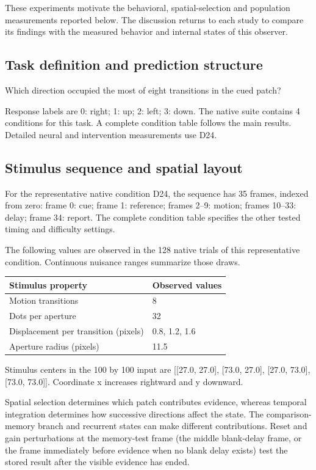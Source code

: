 \documentclass[11pt]{article}
\begin{document}
These experiments motivate the behavioral, spatial-selection and population measurements reported below. The discussion returns to each study to compare its findings with the measured behavior and internal states of this observer.
\subsection{Task definition and prediction structure}
Which direction occupied the most of eight transitions in the cued patch?

Response labels are 0: right; 1: up; 2: left; 3: down. The native suite contains 4 conditions for this task. A complete condition table follows the main results. Detailed neural and intervention measurements use D24.

\subsection{Stimulus sequence and spatial layout}
For the representative native condition D24, the sequence has 35 frames, indexed from zero: frame 0: cue; frame 1: reference; frames 2--9: motion; frames 10--33: delay; frame 34: report. The complete condition table specifies the other tested timing and difficulty settings.

The following values are observed in the 128 native trials of this representative condition. Continuous nuisance ranges summarize those draws.
\begin{center}\small\begin{tabular}{p{}p{}}\toprule Stimulus property & Observed values\\\midrule
Motion transitions & 8\\
Dots per aperture & 32\\
Displacement per transition (pixels) & 0.8, 1.2, 1.6\\
Aperture radius (pixels) & 11.5\\
\bottomrule\end{tabular}\normalsize\end{center}
Stimulus centers in the 100 by 100 input are [[27.0, 27.0], [73.0, 27.0], [27.0, 73.0], [73.0, 73.0]]. Coordinate x increases rightward and y downward.

Spatial selection determines which patch contributes evidence, whereas temporal integration determines how successive directions affect the state. The comparison-memory branch and recurrent states can make different contributions. Reset and gain perturbations at the memory-test frame (the middle blank-delay frame, or the frame immediately before evidence when no blank delay exists) test the stored result after the visible evidence has ended.
\end{document}
